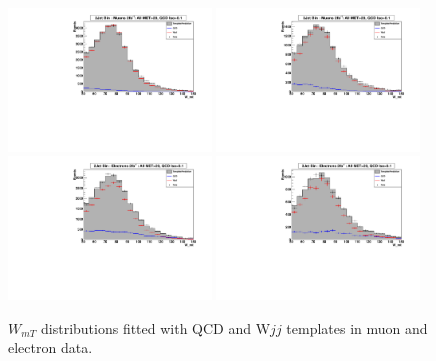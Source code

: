 \begin{figure}[h!] {\centering
\includegraphics[width=0.48\textwidth]{figs/QCDFit2J_Muons_Isog01NoMETDataCuts.pdf}
\includegraphics[width=0.48\textwidth]{figs/QCDFit3J_Muons_Isog01NoMETDataCuts.pdf}
\includegraphics[width=0.48\textwidth]{figs/QCDFit2J_Electrons_Isog01NoMETDataCuts.pdf}
\includegraphics[width=0.48\textwidth]{figs/QCDFit3J_Electrons_Isog01NoMETDataCuts.pdf}
\caption{$W_{mT}$ distributions fitted with QCD and W$jj$ templates in muon and electron data.} 
\label{fig:QCDTemplateFitWmT}}
\end{figure}
